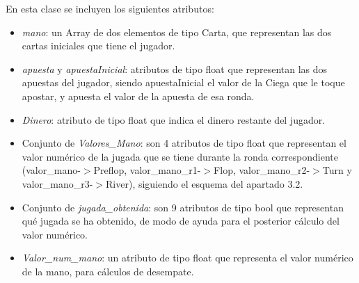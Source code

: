 En esta clase se incluyen los siguientes atributos:
\begin{itemize}
\item \textit{mano}: un Array de dos elementos de tipo Carta, que representan las dos cartas iniciales que tiene el jugador.
\item \textit{apuesta} y \textit{apuestaInicial}: atributos de tipo float que representan las dos apuestas del jugador, siendo apuestaInicial el valor de la Ciega que le toque apostar, y apuesta el valor de la apuesta de esa ronda.
\item \textit{Dinero}: atributo de tipo float que indica el dinero restante del jugador.
\item Conjunto de \textit{Valores\_Mano}: son 4 atributos de tipo float que representan el valor numérico de la jugada  que se tiene durante la ronda correspondiente (valor\_mano-$>$Preflop, valor\_mano\_r1-$>$Flop, valor\_mano\_r2-$>$Turn y valor\_mano\_r3-$>$River), siguiendo el esquema del apartado 3.2.
\item Conjunto de \textit{jugada\_obtenida}: son 9 atributos de tipo bool que representan qué jugada se ha obtenido, de modo de ayuda para el posterior cálculo del valor numérico.
\item\textit{ Valor\_num\_mano}: un atributo de tipo float que representa el valor numérico de la mano, para cálculos de desempate.
\end{itemize}

